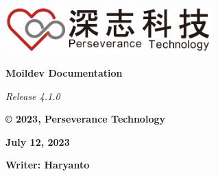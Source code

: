 \documentclass[a4paper]{article}
\begin{document}
\begin{titlepage}
    \begin{FlushRight}
        \RaggedLeft
        \includegraphics[width=0.6\textwidth]{assets/logo.png}\par\vspace{1cm}
        {\Huge \textbf{Moildev Documentation}\par}
        \vspace{0.1cm}
        {\LARGE \textit{Release 4.1.0}\par}
        \vspace{1.5cm}
        {\Large \textbf{© 2023, Perseverance Technology}\par}
        \vspace{0.5cm}
        \vfill
        {\Large \textbf{July 12, 2023}\par}
        \vspace{0.2cm}
        {\large \textbf{Writer: Haryanto}\par}
    \end{FlushRight}
\end{titlepage}
\end{document}
